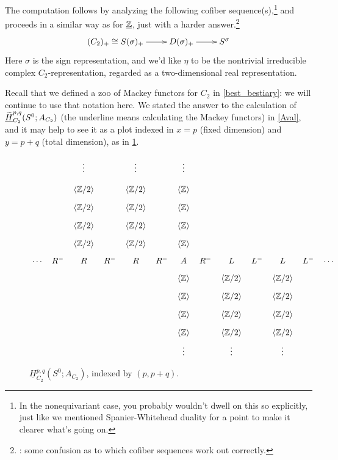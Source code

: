 The computation follows by analyzing the following cofiber sequence(s),\footnote{In the nonequivariant case, you
probably wouldn't dwell on this so explicitly, just like we mentioned Spanier-Whitehead duality for a point to make
it clearer what's going on.} and proceeds in a similar way as for $\underline{\mathbb Z}$, just with a harder
answer.\footnote{\TODO: some confusion as to which cofiber sequences work out correctly.}
\begin{gather}
\label{sigmacofib}
\xymatrix{
	(C_2)_+\cong S(\sigma)_+\ar[r] & D(\sigma)_+\ar[r] & S^\sigma
}
\end{gather}
Here $\sigma$ is the sign representation, and we'd like $\eta$ to be the nontrivial irreducible complex
$C_2$-representation, regarded as a two-dimensional real representation.

Recall that we defined a zoo of Mackey functors for $C_2$ in \cref{best_bestiary}: we will continue to use that
notation here. We stated the answer to the calculation of $\underline{\widetilde H}_{C_2}^{p,q}(S^0;A_{C_2})$ (the underline
means calculating the Mackey functors) in \cref{Aval}, and it may help to see it as a plot indexed in $x = p$
(fixed dimension) and $y = p+q$ (total dimension), as in \cref{ROgdiag}.
\begin{figure}[h!]
\[\xymatrix@R=0.2cm@C=0.2cm{ %
	& & \vdots     && \vdots     && \vdots\\
	& & \ang{\Z/2} && \ang{\Z/2} && \ang\Z\\
	& & \ang{\Z/2} && \ang{\Z/2} && \ang\Z\\
	& & \ang{\Z/2} && \ang{\Z/2} && \ang\Z\\
	& & \ang{\Z/2} && \ang{\Z/2} && \ang\Z\\
	\dotsb & R^- & R & R^- & R & R^- & A & R^- & L & L^- & L & L^- & \dotsb\\
	& & & & & & \ang\Z && \ang{\Z/2} && \ang{\Z/2}\\
	& & & & & & \ang\Z && \ang{\Z/2} && \ang{\Z/2}\\
	& & & & & & \ang\Z && \ang{\Z/2} && \ang{\Z/2}\\
	& & & & & & \ang\Z && \ang{\Z/2} && \ang{\Z/2}\\
	& & & & & & \vdots && \vdots && \vdots
}\]
\caption{$\underline H_{C_2}^{p,q}(S^0;A_{C_2})$, indexed by $(p,p+q)$.}
\label{ROgdiag}
\end{figure}

